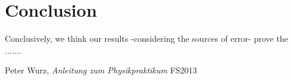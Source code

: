 \documentclass{scrreprt}
\begin{document}
\section{Conclusion}

Conclusively, we think our results -considering the sources of error- prove the .......


\begin{thebibliography}{9}

  Peter Wurz,
  \emph{Anleitung zum Physikpraktikum}
  FS2013

\end{thebibliography}
\end{document}

